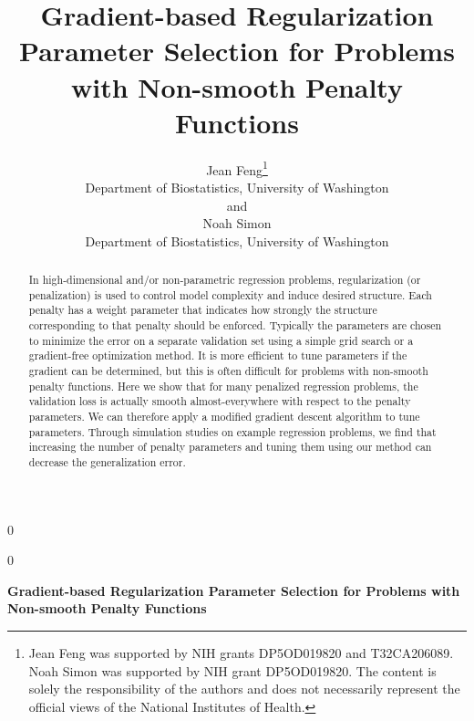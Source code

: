 \documentclass[12pt]{article}
\newcommand{\blind}{0}
\begin{document}
%

\def\spacingset#1{\renewcommand{\baselinestretch}%
{#1}\small\normalsize} \spacingset{1}



\blind
{
  \title{\bf Gradient-based Regularization Parameter Selection for Problems with Non-smooth Penalty Functions}
  \author{Jean Feng\thanks{
    Jean Feng was supported by NIH grants DP5OD019820 and T32CA206089.
    Noah Simon was supported by NIH grant DP5OD019820.
    The content is solely the responsibility of the authors and does not necessarily represent the official views of the National Institutes of Health.}\\
    Department of Biostatistics, University of Washington\\
    and \\
    Noah Simon \\
    Department of Biostatistics, University of Washington}
  \maketitle
} \fi

\blind
{
  \bigskip
  \bigskip
  \bigskip
  \begin{center}
    {\LARGE\bf Gradient-based Regularization Parameter Selection for Problems with Non-smooth Penalty Functions}
\end{center}
  \medskip
} \fi

\bigskip
\begin{abstract}
In high-dimensional and/or non-parametric regression problems, regularization (or penalization) is used to control model complexity and induce desired structure. Each penalty has a weight parameter that indicates how strongly the structure corresponding to that penalty should be enforced. Typically the parameters are chosen to minimize the error on a separate validation set using a simple grid search or a gradient-free optimization method. It is more efficient to tune parameters if the gradient can be determined, but this is often difficult for problems with non-smooth penalty functions. Here we show that for many penalized regression problems, the validation loss is actually smooth almost-everywhere with respect to the penalty parameters. We can therefore apply a modified gradient descent algorithm to tune parameters. Through simulation studies on example regression problems, we find that increasing the number of penalty parameters and tuning them using our method can decrease the generalization error.
\end{abstract}
\end{document}
